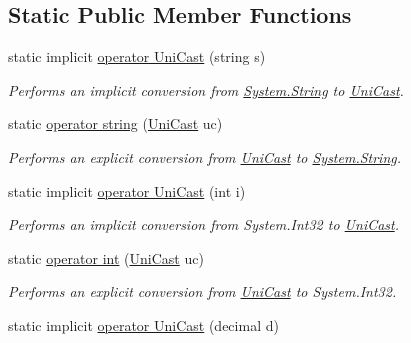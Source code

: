 \subsection*{Static Public Member Functions}
\begin{DoxyCompactItemize}
\item 
static implicit \hyperlink{class_lerp2_a_p_i_1_1_game_1_1_uni_cast_ab3b5eb0c54661436e241a6bda08ba6b0}{operator Uni\+Cast} (string s)
\begin{DoxyCompactList}\small\item\em Performs an implicit conversion from \hyperlink{namespace_lerp2_a_p_i_1_1_game_a2f182da062f210cc43f341f6992ee293a27118326006d3829667a400ad23d5d98}{System.\+String} to \hyperlink{class_lerp2_a_p_i_1_1_game_1_1_uni_cast}{Uni\+Cast}. \end{DoxyCompactList}\item 
static \hyperlink{class_lerp2_a_p_i_1_1_game_1_1_uni_cast_adeb426aa8782266b73a31040d22247b7}{operator string} (\hyperlink{class_lerp2_a_p_i_1_1_game_1_1_uni_cast}{Uni\+Cast} uc)
\begin{DoxyCompactList}\small\item\em Performs an explicit conversion from \hyperlink{class_lerp2_a_p_i_1_1_game_1_1_uni_cast}{Uni\+Cast} to \hyperlink{namespace_lerp2_a_p_i_1_1_game_a2f182da062f210cc43f341f6992ee293a27118326006d3829667a400ad23d5d98}{System.\+String}. \end{DoxyCompactList}\item 
static implicit \hyperlink{class_lerp2_a_p_i_1_1_game_1_1_uni_cast_a922fc21d251c23204822693c8e61cdbe}{operator Uni\+Cast} (int i)
\begin{DoxyCompactList}\small\item\em Performs an implicit conversion from System.\+Int32 to \hyperlink{class_lerp2_a_p_i_1_1_game_1_1_uni_cast}{Uni\+Cast}. \end{DoxyCompactList}\item 
static \hyperlink{class_lerp2_a_p_i_1_1_game_1_1_uni_cast_af143476a40b64b1a503abd8532213197}{operator int} (\hyperlink{class_lerp2_a_p_i_1_1_game_1_1_uni_cast}{Uni\+Cast} uc)
\begin{DoxyCompactList}\small\item\em Performs an explicit conversion from \hyperlink{class_lerp2_a_p_i_1_1_game_1_1_uni_cast}{Uni\+Cast} to System.\+Int32. \end{DoxyCompactList}\item 
static implicit \hyperlink{class_lerp2_a_p_i_1_1_game_1_1_uni_cast_aba4cc688c14d2d72d4e27bdc6228300d}{operator Uni\+Cast} (decimal d)

\end{DoxyCompactItemize}
